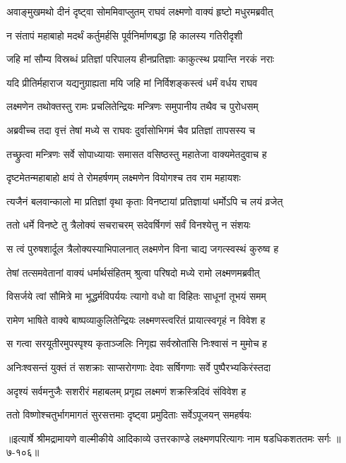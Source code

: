 
\twolineshloka
{अवाङ्मुखमथो दीनं दृष्ट्वा सोममिवाप्लुतम्}
{राघवं लक्ष्मणो वाक्यं हृष्टो मधुरमब्रवीत्} %

\twolineshloka
{न संतापं महाबाहो मदर्थं कर्तुमर्हसि}
{पूर्वनिर्माणबद्धा हि कालस्य गतिरीदृशी} %

\twolineshloka
{जहि मां सौम्य विस्रब्धं प्रतिज्ञां परिपालय}
{हीनप्रतिज्ञाः काकुत्स्थ प्रयान्ति नरकं नराः} %

\twolineshloka
{यदि प्रीतिर्महाराज यद्यनुग्राह्यता मयि}
{जहि मां निर्विशङ्कस्त्वं धर्मं वर्धय राघव} %

\twolineshloka
{लक्ष्मणेन तथोक्तस्तु रामः प्रचलितेन्द्रियः}
{मन्त्रिणः समुपानीय तथैव च पुरोधसम्} %

\twolineshloka
{अब्रवीच्च तदा वृत्तं तेषां मध्ये स राघवः}
{दुर्वासोभिगमं चैव प्रतिज्ञां तापसस्य च} %

\twolineshloka
{तच्छ्रुत्वा मन्त्रिणः सर्वे सोपाध्यायाः समासत}
{वसिष्ठस्तु महातेजा वाक्यमेतदुवाच ह} %

\twolineshloka
{दृष्टमेतन्महाबाहो क्षयं ते रोमहर्षणम्}
{लक्ष्मणेन वियोगश्च तव राम महायशः} %

\twolineshloka
{त्यजैनं बलवान्कालो मा प्रतिज्ञां वृथा कृताः}
{विनष्टायां प्रतिज्ञायां धर्मोऽपि च लयं व्रजेत्} %

\twolineshloka
{ततो धर्मे विनष्टे तु त्रैलोक्यं सचराचरम्}
{सदेवर्षिगणं सर्वं विनश्येत्तु न संशयः} %

\twolineshloka
{स त्वं पुरुषशार्दूल त्रैलोक्यस्याभिपालनात्}
{लक्ष्मणेन विना चाद्य जगत्स्वस्थं कुरुष्व ह} %

\twolineshloka
{तेषां तत्समवेतानां वाक्यं धर्मार्थसंहितम्}
{श्रुत्वा परिषदो मध्ये रामो लक्ष्मणमब्रवीत्} %

\twolineshloka
{विसर्जये त्वां सौमित्रे मा भूद्धर्मविपर्ययः}
{त्यागो वधो वा विहितः साधूनां तूभयं समम्} %

\twolineshloka
{रामेण भाषिते वाक्ये बाष्पव्याकुलितेन्द्रियः}
{लक्ष्मणस्त्वरितं प्रायात्स्वगृहं न विवेश ह} %

\twolineshloka
{स गत्वा सरयूतीरमुपस्पृश्य कृताञ्जलिः}
{निगृह्य सर्वस्रोतांसि निःश्वासं न मुमोच ह} %

\twolineshloka
{अनिःश्वसन्तं युक्तं तं सशक्राः साप्सरोगणाः}
{देवाः सर्षिगणाः सर्वे पुष्पैरभ्यकिरंस्तदा} %

\twolineshloka
{अदृश्यं सर्वमनुजैः सशरीरं महाबलम्}
{प्रगृह्य लक्ष्मणं शक्रस्त्रिदिवं संविवेश ह} %

\twolineshloka
{ततो विष्णोश्चतुर्भागमागतं सुरसत्तमाः}
{दृष्ट्वा प्रमुदिताः सर्वेऽपूजयन् समहर्षयः} %


॥इत्यार्षे श्रीमद्रामायणे वाल्मीकीये आदिकाव्ये उत्तरकाण्डे लक्ष्मणपरित्यागः नाम षडधिकशततमः सर्गः ॥७-१०६॥
